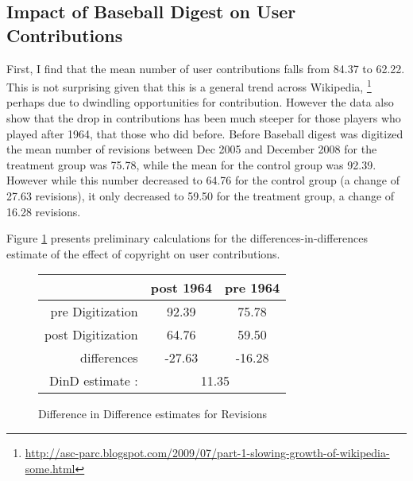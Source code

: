 \documentclass[12pt]{article}
\begin{document}
\subsection{Impact of Baseball Digest on User Contributions}

First, I find that the mean number of user contributions falls from 84.37 to 62.22. This is not surprising given that this is a general trend across Wikipedia, \footnote{\url{http://asc-parc.blogspot.com/2009/07/part-1-slowing-growth-of-wikipedia-some.html}} perhaps due to dwindling opportunities for contribution. However the data also show that the drop in contributions has been much steeper for those players who played after 1964, that those who did before. Before Baseball digest was digitized the mean number of revisions between Dec 2005 and December 2008 for the treatment group was 75.78, while the mean for the control group was 92.39. However while this number decreased to 64.76 for the control group (a change of 27.63 revisions), it only decreased to 59.50 for the treatment group, a change of 16.28 revisions. 



Figure \ref{fig:diffrevstable} presents preliminary calculations for the differences-in-differences estimate of the effect of copyright on user contributions. 

\begin{figure}[h]
\centering
\begin{tabular}{ | r | c | c | }
  \hline                        
   & post 1964 & pre 1964 \\
  \hline                        
  pre Digitization & 92.39 & 75.78 \\
  post Digitization & 64.76 & 59.50 \\
  \hline
   differences & -27.63 & -16.28 \\
  \hline
   DinD estimate : & \multicolumn{2}{|c|}{11.35}  \\
  \hline

\end{tabular}
\caption{Difference in Difference estimates for Revisions}
\label{fig:diffrevstable}
\end{figure}
\end{document}
